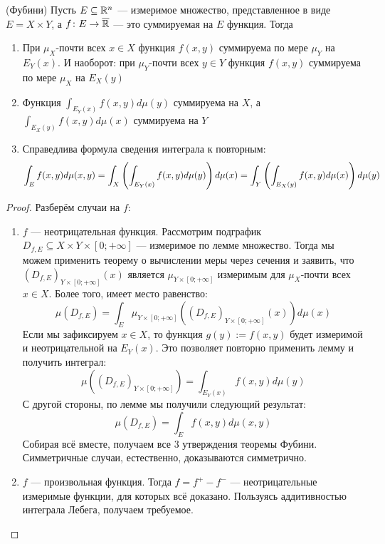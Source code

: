 \begin{theorem} (Фубини)
	Пусть $E \subseteq \mathbb{R}^n$ --- измеримое множество, представленное в виде $E = X \times Y$, а $f \colon E \to \overline{\mathbb{R}}$ --- это суммируемая на $E$ функция. Тогда
	\begin{enumerate}
		\item При $\mu_X$-почти всех $x \in X$ функция $f(x, y)$ суммируема по мере $\mu_Y$ на $E_Y(x)$. И наоборот: при $\mu_Y$-почти всех $y \in Y$ функция $f(x, y)$ суммируема по мере $\mu_X$ на $E_X(y)$
		
		\item Функция $\int_{E_Y(x)} f(x, y)d\mu(y)$ суммируема на $X$, а $\int_{E_X(y)} f(x, y)d\mu(x)$ суммируема на $Y$
		
		\item Справедлива формула сведения интеграла к повторным:
		\[
			\int_E f(x, y)d\mu(x, y) = \int_X \left(\int_{E_Y(x)} f(x, y)d\mu(y)\right)d\mu(x) = \int_Y \left(\int_{E_X(y)} f(x, y)d\mu(x)\right)d\mu(y)
		\]
	\end{enumerate}
\end{theorem}

\begin{proof}
	Разберём случаи на $f$:
	\begin{enumerate}
		\item $f$ --- неотрицательная функция. Рассмотрим подграфик $D_{f, E} \subseteq X \times Y \times [0; +\infty]$ --- измеримое по лемме множество. Тогда мы можем применить теорему о вычислении меры через сечения и заявить, что $(D_{f, E})_{Y \times [0; +\infty]}(x)$ является $\mu_{Y \times [0; +\infty]}$ измеримым для $\mu_X$-почти всех $x \in X$. Более того, имеет место равенство:
		\[
			\mu(D_{f, E}) = \int_E \mu_{Y \times [0; +\infty]}((D_{f, E})_{Y \times [0; +\infty]}(x))d\mu(x)
		\]
		Если мы зафиксируем $x \in X$, то функция $g(y) := f(x, y)$ будет измеримой и неотрицательной на $E_Y(x)$. Это позволяет повторно применить лемму и получить интеграл:
		\[
			\mu((D_{f, E})_{Y \times [0; +\infty]}) = \int_{E_Y(x)} f(x, y) d\mu(y)
		\]
		С другой стороны, по лемме мы получили следующий результат:
		\[
			\mu(D_{f, E}) = \int_E f(x, y)d\mu(x, y)
		\]
		Собирая всё вместе, получаем все 3 утверждения теоремы Фубини. Симметричные случаи, естественно, доказываются симметрично.
		
		\item $f$ --- произвольная функция. Тогда $f = f^+ - f^-$ --- неотрицательные измеримые функции, для которых всё доказано. Пользуясь аддитивностью интеграла Лебега, получаем требуемое.
	\end{enumerate}
\end{proof}

